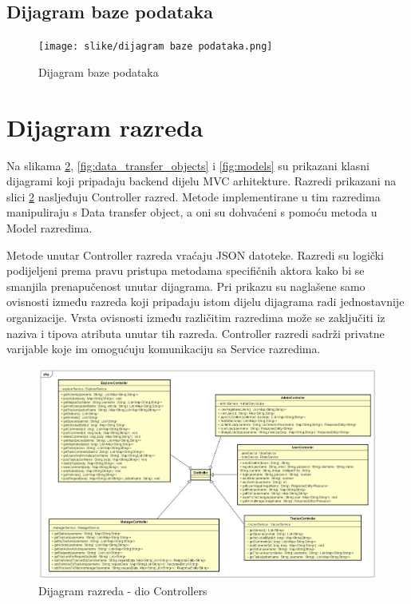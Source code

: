 			\eject

			\subsection{Dijagram baze podataka}

			\begin{figure}[H]
				\texttt{[image: slike/dijagram baze podataka.png]} 
				\centering
				\caption{Dijagram baze podataka}
				\label{fig:dijagram_baze_podataka}
			\end{figure}
			
			\eject
			
			
		\section{Dijagram razreda}

		Na slikama \ref{fig:controllers}, \ref{fig:data_transfer_objects} i \ref{fig:models} su prikazani klasni dijagrami koji pripadaju backend dijelu MVC
		arhitekture. Razredi prikazani na slici \ref{fig:controllers} nasljeđuju Controller razred. 
		Metode implementirane u tim razredima manipuliraju s Data transfer object, a oni
		su dohvaćeni s pomoću metoda u Model razredima. 

		Metode unutar Controller razreda vraćaju JSON datoteke.
		Razredi su logički podijeljeni prema pravu pristupa metodama specifičnih aktora kako bi se smanjila prenapučenost unutar dijagrama.
		Pri prikazu su naglašene samo ovisnosti između razreda koji pripadaju istom dijelu dijagrama radi jednostavnije organizacije.
		Vrsta ovisnosti između različitim razredima može se zaključiti iz naziva i tipova atributa unutar tih razreda.
		Controller razredi sadrži privatne varijable koje im omogućuju komunikaciju sa Service razredima.
		
		\eject

			\begin{figure}[H]
				\includegraphics[scale=0.23]{slike/klasni_dijagram_controllers.jpg}
				\centering
				\caption{Dijagram razreda - dio Controllers}
				\label{fig:controllers}
			\end{figure}
			
